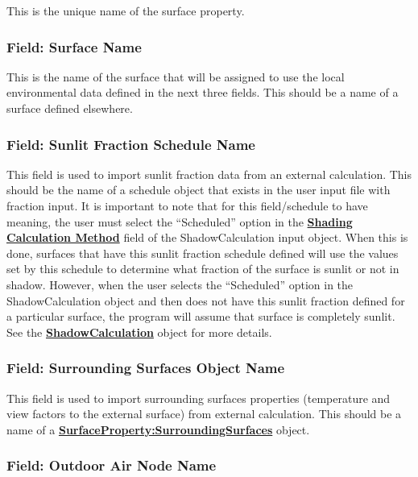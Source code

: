 This is the unique name of the surface property.

\subsubsection{Field: Surface Name}\label{surfacePropertylocalEnvironment-field-surface-name}

This is the name of the surface that will be assigned to use the local environmental data defined in the next three fields.  This should be a name of a surface defined elsewhere.

\subsubsection{Field: Sunlit Fraction Schedule Name}\label{field-sunlit-fraction-schedule-name}

This field is used to import sunlit fraction data from an external calculation. This should be the name of a schedule object that exists in the user input file with fraction input. It is important to note that for this field/schedule to have meaning, the user must select the ``Scheduled'' option in the \textbf{\hyperref[field-shading-calculation-method]{Shading Calculation Method}} field of the ShadowCalculation input object. When this is done, surfaces that have this sunlit fraction schedule defined will use the values set by this schedule to determine what fraction of the surface is sunlit or not in shadow.  However, when the user selects the ``Scheduled'' option in the ShadowCalculation object and then does not have this sunlit fraction defined for a particular surface, the program will assume that surface is completely sunlit. See the  \textbf{\hyperref[shadowcalculation]{ShadowCalculation}} object for more details.

\subsubsection{Field: Surrounding Surfaces Object Name}\label{field-surrounding-surfaces-object-name}

This field is used to import surrounding surfaces properties (temperature and view factors to the external surface) from external calculation. This should be a name of a \textbf{\hyperref[surfacePropertySurroundingSurfaces]{SurfaceProperty:SurroundingSurfaces}} object.

\subsubsection{Field: Outdoor Air Node Name}\label{field-outdoor-air-node-name}

